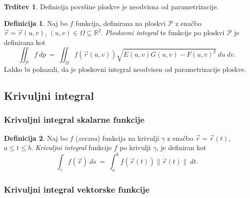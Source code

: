 \documentclass[11pt]{article}
\theoremstyle{definition}
\newtheorem{definicija}{Definicija}[section]
\theoremstyle{definition}
\newtheorem{trditev}{Trditev}[section]
\theoremstyle{definition}
\begin{document}
\begin{trditev}

Definicija površine ploskve je neodvisna od parametrizacije.

\end{trditev}
\vspace{0.5cm}

\begin{definicija}

Naj bo $f$ funkcija, definirana na ploskvi $\mathcal{P}$ z enačbo \\$\vec{r} = \vec{r}(u, v)$, $(u, v) \in \Omega \subseteq \mathbb{R}^2$. \textit{Ploskovni integral} te funkcije po ploskvi $\mathcal{P}$ je definirana kot 
$$\iint_{\mathcal{P}} f~dp ~=~ \iint_{\Omega} f(\vec{r}(u, v))\sqrt{E(u, v)G(u, v) - F(u, v)^2}~du~dv.$$
Lahko bi pokazali, da je ploskovni integral neodvisen od parametrizacije ploskve.

\end{definicija}
\vspace{0.5cm}


\subsection{Krivuljni integral}
\vspace{0.5cm}

\subsubsection{Krivuljni integral skalarne funkcije}

\begin{definicija}

Naj bo $f$ (\textit{zvezna}) funkcija na krivulji $\gamma$ z enačbo $\vec{r} = \vec{r}(t)$, $a \leq t \leq b$. \textit{Krivuljni integral} funkcije $f$ po krivulji $\gamma$, je definiran kot
$$\int_{\gamma} f(\vec{r})~ds ~=~ \int_{a}^{b} f(\vec{r}(t))\|\dot{\vec{r}}(t)\|~dt.$$

\end{definicija}
\vspace{0.5cm}

\subsubsection{Krivuljni integral vektorske funkcije}
\end{document}
